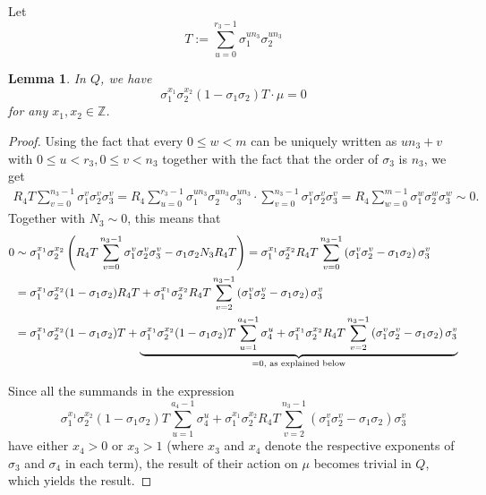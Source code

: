 \documentclass[12pt,a4paper]{article}
\newtheorem{lemma}[theorem]{Lemma}
\theoremstyle{definition}
\newcommand{\Z}{\mathbb{Z}}
\begin{document}
Let $$T:=\sum_{u=0}^{r_3-1}\sigma_1^{un_3}\sigma_2^{un_3}$$

\begin{lemma}\label{Tdiag}
In $Q$, we have $$\sigma_1^{x_1}\sigma_2^{x_2}(1-\sigma_1\sigma_2)T\cdot \mu=0$$
for any $x_1,x_2\in\Z$.
\end{lemma}
\begin{proof}
Using the fact that every $0\leq w<m$ can be uniquely written as $un_3+v$ with $0\leq u<r_3, 0\leq v<n_3$ together with the fact that the order of $\sigma_3$ is $n_3$, we get 
\begin{align*}
R_4T\sum_{v=0}^{n_3-1}\sigma_1^{v}\sigma_2^{v}\sigma_3^{v}=R_4\sum_{u=0}^{r_3-1}\sigma_1^{un_3}\sigma_2^{un_3}\sigma_3^{un_3}\cdot \sum_{v=0}^{n_3-1}\sigma_1^{v}\sigma_2^{v}\sigma_3^{v}=R_4\sum_{w=0}^{m-1}\sigma_1^{w}\sigma_2^{w}\sigma_3^{w}\sim 0.
\end{align*}
Together with $N_3\sim 0$, this means that 
\begin{align*}
0&\sim \sigma_1^{x_1}\sigma_2^{x_2}\left(R_4T \sum_{v=0}^{n_3-1}\sigma_1^{v}\sigma_2^{v}\sigma_3^{v}-\sigma_1\sigma_2N_3R_4T\right)=\sigma_1^{x_1}\sigma_2^{x_2}R_4T\sum_{v=0}^{n_3-1}\left(\sigma_1^{v}\sigma_2^{v}-\sigma_1\sigma_2\right)\sigma_3^{v}\\
&=\sigma_1^{x_1}\sigma_2^{x_2}(1-\sigma_1\sigma_2)R_4T+\sigma_1^{x_1}\sigma_2^{x_2}R_4T\sum_{v=2}^{n_3-1}\left(\sigma_1^{v}\sigma_2^{v}-\sigma_1\sigma_2\right)\sigma_3^{v}\\
&=\sigma_1^{x_1}\sigma_2^{x_2}(1-\sigma_1\sigma_2)T+\underbrace{\sigma_1^{x_1}\sigma_2^{x_2}(1-\sigma_1\sigma_2)T\sum_{u=1}^{a_4-1}\sigma_4^u+\sigma_1^{x_1}\sigma_2^{x_2}R_4T\sum_{v=2}^{n_3-1}\left(\sigma_1^{v}\sigma_2^{v}-\sigma_1\sigma_2\right)\sigma_3^{v}}_{
=0, \text{ as explained below}
}
\end{align*}

Since all the summands in the expression $$\sigma_1^{x_1}\sigma_2^{x_2}(1-\sigma_1\sigma_2)T\sum_{u=1}^{a_4-1}\sigma_4^u+\sigma_1^{x_1}\sigma_2^{x_2}R_4T\sum_{v=2}^{n_3-1}\left(\sigma_1^{v}\sigma_2^{v}-\sigma_1\sigma_2\right)\sigma_3^{v}$$
have either $x_4>0$ or $x_3>1$ (where $x_3$ and $x_4$ denote the respective exponents of $\sigma_3$ and $\sigma_4$ in each term), the result of their action on $\mu$ becomes trivial in $Q$, which yields the result.
\end{proof}
\end{document}
